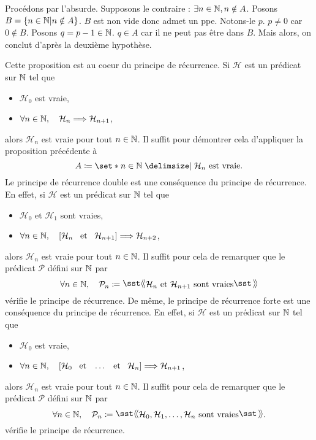 \documentclass{magnolia}
\begin{document}
\begin{preuve}
Procédons par l'absurde. Supposons le contraire : $\exists n\in \mathbb{N}, n\notin A$.
Posons $B=\left\{n\in \mathbb{N} | n\notin A\right\}$. $B$ est non vide donc admet un ppe. Notons-le $p$. $p\neq 0$ car $0\notin B$. Posons $q=p-1 \in \mathbb{N}$. $q\in A$ car il ne peut pas être dans $B$. Mais alors, on conclut d'après la deuxième hypothèse.

\end{preuve}

\begin{remarques}
\remarque Cette proposition est au coeur du principe de récurrence. Si $\mathcal{H}$ est un prédicat sur $\mathbb{N}$ tel que
\begin{itemize}
\item $\mathcal{H}_0$ est vraie,
\item $\forall n\in\mathbb{N},\quad \mathcal{H}_n \Longrightarrow \mathcal{H}_{n+1}$,
\end{itemize}
alors $\mathcal{H}_n$ est vraie pour tout $n\in\mathbb{N}$. Il suffit pour démontrer cela d'appliquer la proposition précédente à \[A\defeq\enstq{n\in\N}{\text{$\mathcal{H}_n$ est vraie}}.\]
\remarque Le principe de récurrence double est une conséquence du principe de récurrence. En effet, si $\mathcal{H}$ est un prédicat sur $\mathbb{N}$ tel que
\begin{itemize}
\item $\mathcal{H}_0$ et $\mathcal{H}_1$ sont vraies,
\item $\forall n\in\mathbb{N},\quad \left[\mathcal{H}_n \quad\!\text{et}\quad\! \mathcal{H}_{n+1}\right]\Longrightarrow \mathcal{H}_{n+2}$,
\end{itemize}
alors $\mathcal{H}_n$ est vraie pour tout $n\in\mathbb{N}$. Il suffit pour cela de remarquer que le prédicat $\mathcal{P}$ défini sur $\mathbb{N}$ par \[\forall n\in\N\qsep \mathcal{P}_n\defeq\text{\og} \mathcal{H}_n\text{ et }\mathcal{H}_{n+1}\text{ sont vraies} \text{\fg}\]
vérifie le principe de récurrence.
\remarque De même, le principe de récurrence forte est une conséquence du principe de récurrence.
  En effet, si $\mathcal{H}$ est un prédicat sur $\mathbb{N}$ tel que
\begin{itemize}
\item $\mathcal{H}_0$ est vraie,
\item $\forall n\in\mathbb{N},\quad \left[\mathcal{H}_0 \quad\!\text{et}\quad\!\ldots\quad\!\text{et}\quad\! \mathcal{H}_n\right]\Longrightarrow \mathcal{H}_{n+1}$,
\end{itemize}
  alors $\mathcal{H}_n$ est vraie pour tout $n\in\mathbb{N}$. Il suffit pour cela de remarquer que le prédicat $\mathcal{P}$ défini sur $\mathbb{N}$ par 
\[\forall n\in\N\qsep \mathcal{P}_n\defeq\text{\og} \mathcal{H}_0, \mathcal{H}_1, \ldots, \mathcal{H}_{n}\text{ sont vraies} \text{\fg}.\]
vérifie le principe de récurrence.
\end{remarques}
\end{document}
